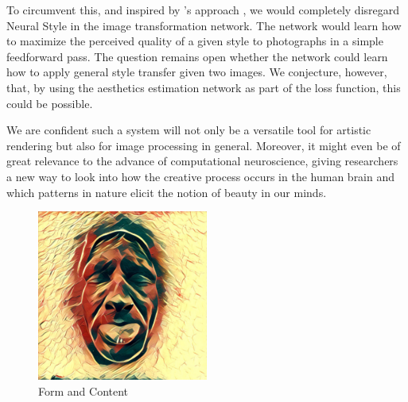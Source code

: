 To circumvent this, and inspired by \citeauthor{Johnson2016}'s approach \cite{Johnson2016}, we would completely disregard Neural Style in the image transformation network.
The network would learn how to maximize the perceived quality of a given style to photographs in a simple feedforward pass.
The question remains open whether the network could learn how to apply general style transfer given two images.
We conjecture, however, that, by using the aesthetics estimation network as part of the loss function, this could be possible.

We are confident such a system will not only be a versatile tool for artistic rendering but also for image processing in general.
Moreover, it might even be of great relevance to the advance of computational neuroscience, giving researchers a new way to look into how the creative process occurs in the human brain and which patterns in nature elicit the notion of beauty in our minds.

\vspace*{\fill}
{
  \begin{figure}[h]
    \setlength{\abovecaptionskip}{0pt}
    \captionsetup{
      font=bf,
      justification=centering,
      labelformat=empty
    }
    \begin{center}
      \includegraphics[width=0.5\textwidth]{gfx/prisma}
    \end{center}
    \caption{Form and Content}
  \end{figure}
}
\vspace*{\fill}
